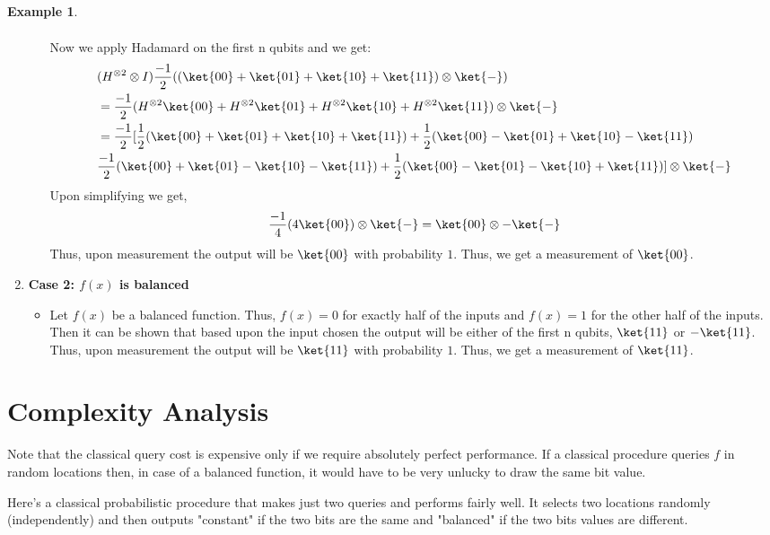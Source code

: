 \documentclass[12pt, oneside]{book}
\theoremstyle{definition}
\theoremstyle{definition}
\newtheorem{example}{Example}[section]
\theoremstyle{remark}
\begin{document}
\begin{example}
\begin{enumerate}
\begin{itemize}
\begin{align*}
            \end{align*}
            Now we apply Hadamard on the first n qubits and we get:
            \begin{align*}
                &(H^{\otimes 2}\otimes I)\frac{-1}{2}((\ket{00}+\ket{01}+\ket{10}+\ket{11})\otimes \ket{-})\\
                &=\frac{-1}{2}(H^{\otimes 2}\ket{00}+H^{\otimes 2}\ket{01}+H^{\otimes 2}\ket{10}+H^{\otimes 2}\ket{11})\otimes \ket{-}\\
                &=\frac{-1}{2}[\frac{1}{2}(\ket{00}+\ket{01}+\ket{10}+\ket{11})+\frac{1}{2}(\ket{00}-\ket{01}+\ket{10}-\ket{11})\\
                &\frac{-1}{2}(\ket{00}+\ket{01}-\ket{10}-\ket{11})+\frac{1}{2}(\ket{00}-\ket{01}-\ket{10}+\ket{11})]\otimes \ket{-}
            \end{align*}
            Upon simplifying we get,
            \[
                \frac{-1}{4}(4\ket{00})\otimes \ket{-}=\ket{00}\otimes -\ket{-}
            \]
            Thus, upon measurement the output will be $\ket{00}$ with probability $1$. Thus, we get a measurement of $\ket{00}$.
        \end{itemize}
        \item \textbf{Case 2: $f(x)$ is balanced}\\
        \begin{itemize}
            \item Let $f(x)$ be a balanced function. Thus, $f(x)=0$ for exactly half of the inputs and $f(x)=1$ for the other half of the inputs.
            Then it can be shown that based upon the input chosen the output will be either of the first n qubits, $\ket{11}$ or $-\ket{11}$.
            Thus, upon measurement the output will be $\ket{11}$ with probability $1$. Thus, we get a measurement of $\ket{11}$.
        \end{itemize}
    \end{enumerate}
\end{example}

\section{Complexity Analysis}
Note that the classical query cost is expensive only if we require absolutely perfect performance. If a classical procedure queries $f$ in random locations then, in case of a balanced function, it would have to be very unlucky to draw the same bit value.

Here's a classical probabilistic procedure that makes just two queries and performs fairly well. It selects two locations randomly (independently) and then outputs "constant" if the two bits are the same and "balanced" if the two bits values are different.
\end{document}
